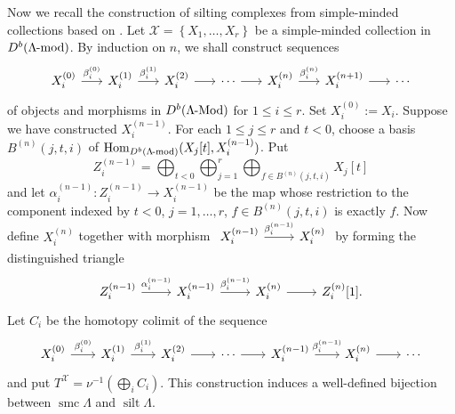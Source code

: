 \documentclass[pdftex,a4paper]{article}
\numberwithin{equation}{subsection}
\theoremstyle{definition}
\newcommand{\lmod}{\operatorname{\mathrm{\hspace{-2pt}-mod}}}
\newcommand{\lMod}{\operatorname{\mathrm{\hspace{-2pt}-Mod}}}
\newcommand{\silt}{\operatorname{\mathrm{silt}}}
\newcommand{\Hom}{\operatorname{Hom}\nolimits}
\newcommand{\smc}{\operatorname{\mathrm{smc}}}
\begin{document}
Now we recall the construction of silting complexes from simple-minded collections based on \cite{MR3178243,MR1947972}.
Let \(\mathcal{X}=\left\{X_1, \ldots, X_r \right\}\) be a simple-minded collection in \(D^b(\Lambda\lmod)\). By induction on \(n\), we shall construct sequences
\begin{equation}
	\begin{tikzcd}[column sep=0.6cm]
		X_i^{(0)} \ar[r,"\beta_i^{(0)}"]& X_i^{(1)} \ar[r,"\beta_i^{(1)}"]& X_i^{(2)} \ar[r]& \cdots \ar[r]&X_i^{(n)} \ar[r,"\beta_i^{(n)}"]&X_i^{(n+1)}\ar[r]&\cdots
	\end{tikzcd}
\end{equation}
of objects and morphisms in \(D^b(\Lambda\lMod)\) for \(1\leq i\leq r\). Set \(X_i^{(0)}:=X_i\). Suppose we have constructed \(X_i^{(n-1)}\). For each \(1\leq j\leq r\) and \(t<0\), choose a basis \(B^{(n)}(j,t,i)\) of \(\Hom_{D^b(\Lambda\lmod)}(X_j[t],X_i^{(n-1)})\). Put
\begin{equation}
	Z_i^{(n-1)}=\bigoplus_{t<0}\bigoplus_{j=1}^{r}\bigoplus_{f\in B^{(n)}(j,t,i)}X_j[t]
\end{equation}
and let \(\alpha_i^{(n-1)}\colon Z_i^{(n-1)} \rightarrow X_i^{(n-1)}\) be the map whose restriction to the component indexed by \(t<0\), \(j=1,\ldots, r\), \(f \in B^{(n)}(j,t,i)\) is exactly \(f\).
Now define \(X_i^{(n)}\) together with morphism
\(
\begin{tikzcd}
	X_i^{(n-1)}\ar[r,"\beta_i^{(n-1)}"]&X_i^{(n)}
\end{tikzcd}
\)
by forming the distinguished triangle
\begin{equation}
	\begin{tikzcd}
		Z_i^{(n-1)}\ar[r,"\alpha_i^{(n-1)}"]&X_i^{(n-1)}\ar[r,"\beta_i^{(n-1)}"]&X_i^{(n)}\ar[r]&Z_i^{(n)}[1].
	\end{tikzcd}
\end{equation}
Let \(C_i\) be the homotopy colimit of the sequence
\begin{equation}
	\begin{tikzcd}[column sep=0.7cm]
		X_i^{(0)} \ar[r,"\beta_i^{(0)}"]& X_i^{(1)} \ar[r,"\beta_i^{(1)}"]& X_i^{(2)} \ar[r]& \cdots \ar[r]&X_i^{(n-1)} \ar[r,"\beta_i^{(n-1)}"]&X_i^{(n)}\ar[r]&\cdots
	\end{tikzcd}
\end{equation}
and put \(T^{\mathcal{X}}=\nu^{-1}(\bigoplus_i C_i)\).
This construction induces a well-defined bijection between \(\smc \Lambda\) and \(\silt \Lambda\).
\end{document}
